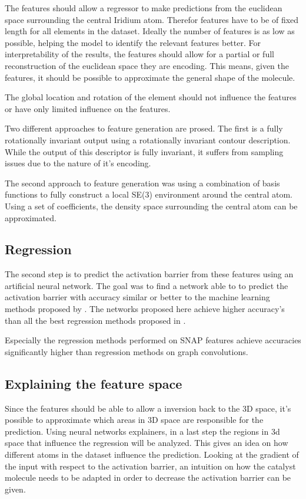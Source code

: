 The features should allow a regressor to make predictions from the euclidean space surrounding the central Iridium atom.
Therefor features have to be of fixed length for all elements in the dataset.
Ideally the number of features is as low as possible, helping the model to identify the relevant features better.
For interpretability of the results, the features should allow for a partial or full reconstruction of the euclidean space they are encoding.
This means, given the features, it should be possible to approximate the general shape of the molecule.

The global location and rotation of the element should not influence the features or have only limited influence on the features.

Two different approaches to feature generation are prosed.
The first is a fully rotationally invariant output using a rotationally invariant contour description.
While the output of this descriptor is fully invariant, it suffers from sampling issues due to the nature of it's encoding.

The second approach to feature generation was using a combination of basis functions to fully construct a local SE(3) environment around the central atom.
Using a set of coefficients, the density space surrounding the central atom can be approximated.

\subsection{Regression}

The second step is to predict the activation barrier from these features using an artificial neural network.
The goal was to find a network able to to predict the activation barrier with accuracy similar or better to the machine learning methods proposed by \citeauthor{friederich_dos}.
The networks proposed here achieve higher accuracy's than all the best regression methods proposed in \cite{friederich_dos}.

Especially the regression methods performed on SNAP features achieve accuracies significantly higher than regression methods on graph convolutions.

\subsection{Explaining the feature space}
Since the features should be able to allow a inversion back to the 3D space, it's possible to approximate which areas in 3D space are responsible for the prediction.
Using neural networks explainers, in  a last step the regions in 3d space that influence the regression will be analyzed.
This gives an idea on how different atoms in the dataset influence the prediction.
Looking at the gradient of the input with respect to the activation barrier, an intuition on how the catalyst molecule needs to be 
adapted in order to decrease the activation barrier can be given.

